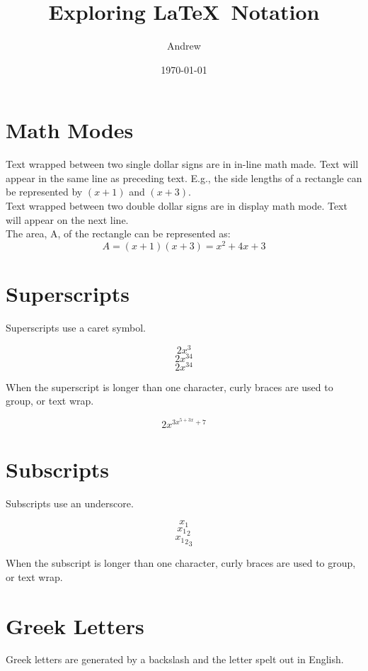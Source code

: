 \documentclass[11pt]{article}
\begin{document}
\title{Exploring \LaTeX \ Notation}
\author{Andrew}
\date{\today}
\maketitle

\newpage
\tableofcontents
\clearpage

\section{Math Modes}

Text wrapped between two single dollar signs are in in-line math made. Text will appear in the same line as preceding text. E.g., the side lengths of a rectangle can be represented by $(x+1)$ and $(x+3)$.  \\

Text wrapped between two double dollar signs are in display math mode. Text will appear on the next line. \\

The area, A, of the rectangle can be represented as: $$A=(x+1)(x+3)=x^2+4x+3$$

\section{Superscripts}

Superscripts use a caret symbol. 

$$2x^3$$
$$2x^34$$
$$2x^{34}$$

When the superscript is longer than one character, curly braces are used to group, or text wrap. 

$$2x^{3x^{5+3x}+7}$$

\section{Subscripts}

Subscripts use an underscore. 

$$x_1$$
$${x_1}_2$$
$${{x_1}_2}_3$$

When the subscript is longer than one character, curly braces are used to group, or text wrap.

\section{Greek Letters}

Greek letters are generated by a backslash and the letter spelt out in English. 
\end{document}
